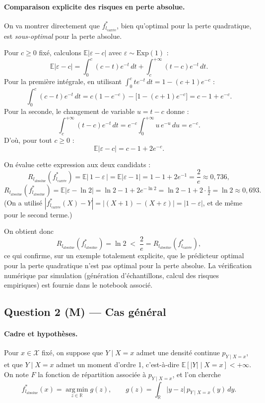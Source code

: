 \documentclass[11pt]{article}
\theoremstyle{remark}
\newcommand{\X}{\mathcal{X}}
\newcommand{\E}{\mathbb{E}}
\newcommand{\R}{\mathbb{R}}
\begin{document}
	\paragraph{Comparaison explicite des risques en perte absolue.}
	On va montrer directement que $f^*_{l_{\text{carrée}}}$, bien qu'optimal pour la perte quadratique, est \emph{sous-optimal} pour la perte absolue.
	
	Pour $c \geq 0$ fixé, calculons $\E|\varepsilon - c|$ avec $\varepsilon \sim \mathrm{Exp}(1)$ :
	\[
	\E|\varepsilon - c| = \int_0^c (c-t)e^{-t}\,dt + \int_c^{+\infty}(t-c)e^{-t}\,dt.
	\]
	Pour la première intégrale, en utilisant $\int_0^c t e^{-t}\,dt = 1-(c+1)e^{-c}$ :
	\[
	\int_0^c (c-t)e^{-t}\,dt = c(1-e^{-c}) - \big[1-(c+1)e^{-c}\big] = c - 1 + e^{-c}.
	\]
	Pour la seconde, le changement de variable $u = t-c$ donne :
	\[
	\int_c^{+\infty}(t-c)e^{-t}\,dt = e^{-c}\int_0^{+\infty} u\,e^{-u}\,du = e^{-c}.
	\]
	D'où, pour tout $c \geq 0$ :
	\[
	\E|\varepsilon - c| = c - 1 + 2e^{-c}.
	\]
	
	On évalue cette expression aux deux candidats :
	\[
	R_{l_{\text{absolue}}}(f^*_{l_{\text{carrée}}}) = \E\big|\,1 - \varepsilon\,\big| = \E|\varepsilon - 1| = 1 - 1 + 2e^{-1} = \frac{2}{e} \approx 0{,}736,
	\]
	\[
	R_{l_{\text{absolue}}}(f^*_{l_{\text{absolue}}}) = \E|\varepsilon - \ln 2| = \ln 2 - 1 + 2e^{-\ln 2} = \ln 2 - 1 + 2\cdot\tfrac12 = \ln 2 \approx 0{,}693.
	\]
	(On a utilisé $|f^*_{l_{\text{carrée}}}(X) - Y| = |(X+1)-(X+\varepsilon)| = |1-\varepsilon|$, et de même pour le second terme.)
	
	On obtient donc
	\[
	\boxed{R_{l_{\text{absolue}}}(f^*_{l_{\text{absolue}}}) = \ln 2 \;<\; \frac{2}{e} = R_{l_{\text{absolue}}}(f^*_{l_{\text{carrée}}})},
	\]
	ce qui confirme, sur un exemple totalement explicite, que le prédicteur optimal pour la perte quadratique n'est pas optimal pour la perte absolue. La vérification numérique par simulation (génération d'échantillons, calcul des risques empiriques) est fournie dans le notebook associé.
	
	\subsection*{Question 2 (M) --- Cas général}
	
	\paragraph{Cadre et hypothèses.}
	Pour $x \in \X$ fixé, on suppose que $Y \mid X=x$ admet une densité continue $p_{Y\mid X=x}$, et que $Y\mid X=x$ admet un moment d'ordre 1, c'est-à-dire $\E[|Y| \mid X=x] < +\infty$. On note $F$ la fonction de répartition associée à $p_{Y\mid X=x}$, et l'on cherche
	\[
	f^*_{l_{\text{absolue}}}(x) = \operatorname*{arg\,min}_{z \in \R} g(z), \qquad g(z) = \int_{\R} |y-z|\, p_{Y\mid X=x}(y)\,dy.
	\]
	
\end{document}
